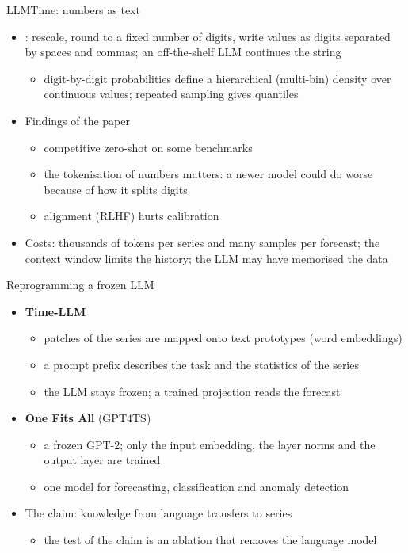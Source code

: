 \begin{frame}{LLMTime: numbers as text}
\itemsize{\small}
\begin{itemize}
    \item {}: rescale, round to a fixed number of digits, write values as digits separated by spaces and commas; an off-the-shelf LLM continues the string
    \begin{itemize}
        \item digit-by-digit probabilities define a hierarchical (multi-bin) density over continuous values; repeated sampling gives quantiles
    \end{itemize}
    \item Findings of the paper
    \begin{itemize}
        \item competitive zero-shot on some benchmarks
        \item the tokenisation of numbers matters: a newer model could do worse because of how it splits digits
        \item alignment (RLHF) hurts calibration
    \end{itemize}
    \item Costs: thousands of tokens per series and many samples per forecast; the context window limits the history; the LLM may have memorised the data
\end{itemize}
\end{frame}

\begin{frame}{Reprogramming a frozen LLM}
\itemsize{\small}
\begin{itemize}
    \item \textbf{Time-LLM} 
    \begin{itemize}
        \item patches of the series are mapped onto text prototypes (word embeddings)
        \item a prompt prefix describes the task and the statistics of the series
        \item the LLM stays frozen; a trained projection reads the forecast
    \end{itemize}
    \item \textbf{One Fits All} (GPT4TS) 
    \begin{itemize}
        \item a frozen GPT-2; only the input embedding, the layer norms and the output layer are trained
        \item one model for forecasting, classification and anomaly detection
    \end{itemize}
    \item The claim: knowledge from language transfers to series
    \begin{itemize}
        \item the test of the claim is an ablation that removes the language model
    \end{itemize}
\end{itemize}
\end{frame}

